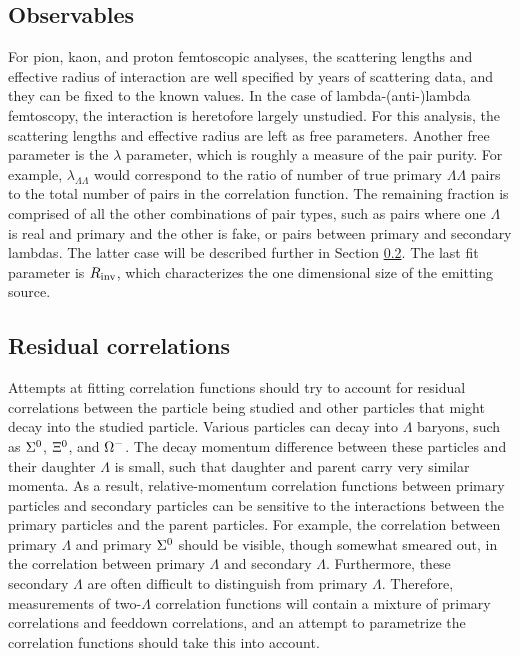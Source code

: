 \subsection{Observables}
\label{sec:Observables}
For pion, kaon, and proton femtoscopic analyses, the scattering lengths and effective radius of interaction are well specified by years of scattering data, and they can be fixed to the known values.  In the case of lambda-(anti-)lambda femtoscopy, the interaction is heretofore largely unstudied.  For this analysis, the scattering lengths and effective radius are left as free parameters.  Another free parameter is the $\lambda$ parameter, which is roughly a measure of the pair purity.  For example, $\lambda_{\Lambda\Lambda}$ would correspond to the ratio of number of true primary $\Lambda\Lambda$ pairs to the total number of pairs in the correlation function. The remaining fraction is comprised of all the other combinations of pair types, such as pairs where one $\Lambda$ is real and primary and the other is fake, or pairs between primary and secondary lambdas.  The latter case will be described further in Section \ref{sec:Residual}.  The last fit parameter is $R_{\rm inv}$, which characterizes the one dimensional size of the emitting source.  


\subsection{Residual correlations}
\label{sec:Residual}

Attempts at fitting correlation functions should try to account for residual correlations between the particle being studied and other particles that might decay into the studied particle.  Various particles can decay into $\Lambda$ baryons, such as $\Sigma^{\rm 0}$, $\Xi^{\rm 0}$, and $\Omega^{\rm -}$.  The decay momentum difference between these particles and their daughter $\Lambda$ is small, such that daughter and parent carry very similar momenta.  As a result, relative-momentum correlation functions between primary particles and secondary particles can be sensitive to the interactions between the primary particles and the parent particles.  For example, the correlation between primary $\Lambda$ and primary $\Sigma^{\rm 0}$ should be visible, though somewhat smeared out, in the correlation between primary $\Lambda$ and secondary $\Lambda$.  Furthermore, these secondary $\Lambda$ are often difficult to distinguish from primary $\Lambda$.  Therefore, measurements of two-$\Lambda$ correlation functions will contain a mixture of primary correlations and feeddown correlations, and an attempt to parametrize the correlation functions should take this into account.  

